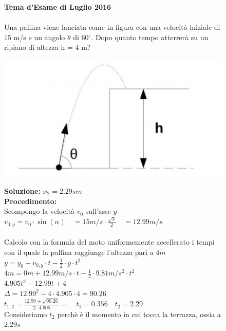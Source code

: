 \begin{figure}[h!]
\textbf{Tema d'Esame di Luglio 2016}\\ \\
Una pallina viene lanciata come in figura con una velocità iniziale di 15 m/s e un
angolo $\theta$ di 60$^{\circ}$. Dopo quanto tempo atterrerà su un ripiano di altezza h = 4 m?
\\
	\begin{center}
		\includegraphics[scale=0.7]{ES1/LUG012016.jpg}
	\end{center}
\begin{boxed}
\null\hfill \textbf{Soluzione:} $x_2 = 2.29s m$\\
\textbf{Procedimento: } \\
Scompongo la velocità $v_0$ sull'asse $y$\\
$v_{0,y}= v_0 \cdot \sin(\alpha) \quad = 15m/s\cdot \frac{\sqrt{3}}{2} \quad = 12.99m/s$ \\ \\
Calcolo con la formula del moto uniformemente accellerato i tempi con il quale la pallina raggiunge l'altezza pari a $4m$ \\

$y= y_0 + v_{0,y}\cdot t -\frac{1}{2}\cdot g \cdot t^2$\\
$4m=0m+12.99m/s \cdot t -\frac{1}{2}\cdot 9.81 m/s^2 \cdot t^2 $\\
$4.905 t^2 -12.99t +4 $\\
$\Delta = 12.99^2-4 \cdot 4.905 \cdot 4 = 90.26 $\\
$ t_{1,2} = \frac{12.99 \pm \sqrt{90.26}}{2\cdot 4.905} = \quad t_1=0.356 \quad t_2=2.29$\\

Consideriamo $t_2$ perchè è il momento in cui tocca la terrazza, ossia a $2.29s$
\end{boxed}
\end{figure}
\clearpage


